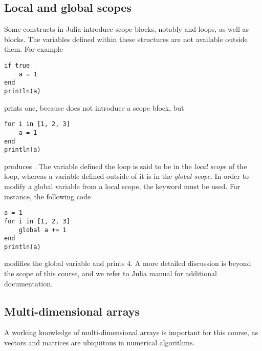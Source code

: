 \subsection*{Local and global scopes}%
Some constructs in Julia introduce scope blocks, notably  and  loops,
as well as  blocks.
The variables defined within these structures are not available outside them.
For example
\begin{verbatim}
if true
    a = 1
end
println(a)
\end{verbatim}
prints one,
because  does not introduce a scope block,
but
\begin{verbatim}
for i in [1, 2, 3]
    a = 1
end
println(a)
\end{verbatim}
produces .
The variable  defined the  loop is said to be in the \emph{local scope} of the loop,
whereas a variable defined outside of it is in the \emph{global scope}.
In order to modify a global variable from a local scope,
the  keyword must be used.
For instance, the following code
\begin{verbatim}
a = 1
for i in [1, 2, 3]
    global a += 1
end
println(a)
\end{verbatim}
modifies the global variable  and prints 4.
A more detailed discussion is beyond the scope of this course,
and we refer to Julia manual for additional documentation.

\subsection*{Multi-dimensional arrays}%
\label{sub:multi_dimensional_arrays}

A working knowledge of multi-dimensional arrays is important for this course,
as vectors and matrices are ubiquitous in numerical algorithms.

